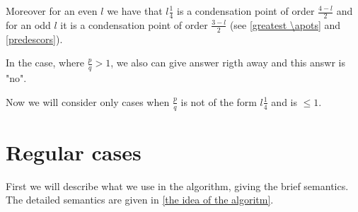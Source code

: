Moreover for an even $l$ we have that $l\frac{1}{4}$ is a condensation point of order 
$\frac{4-l}{2}$ 
and for an odd $l$ it is a condensation point of order $\frac{3-l}{2}$ (see \ref{greatest \apots} 
and \ref{predescors}). 

In the case, where $\frac{p}{q} > 1$, we also can give answer rigth away and this answr is "no". 

Now we will consider only cases when $\frac{p}{q}$ is not of the form $l\frac{1}{4}$ and is 
$\leq 1$.
%
%
%
%
%
%
\section{Regular cases}
First we will describe what we use in the algorithm, giving the brief semantics. 
The detailed semantics are given in \ref{the idea of the algoritm}.

